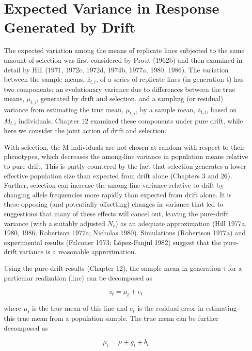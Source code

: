 \documentclass{article}
\begin{document}
\section{Expected Variance in Response Generated by Drift}
The expected variation among the means of replicate lines subjected to the same amount of selection was first considered by Prout (1962b) and then examined in detail by Hill (1971, 1972c, 1972d, 1974b, 1977a, 1980, 1986). The variation between the sample means,  $ \overline{z}_{t,i} $, of a series of replicate lines (in generation t) has two components: an evolutionary variance due to differences between the true means,  $ \mu_{t,i} $, generated by drift and selection, and a sampling (or residual) variance from estimating the true mean,  $ \mu_{t,i} $, by a sample mean,  $ \overline{z}_{t,i} $, based on  $ M_{t,i} $ individuals. Chapter 12 examined these components under pure drift, while here we consider the joint action of drift and selection.

With selection, the M individuals are not chosen at random with respect to their phenotypes, which decreases the among-line variance in population means relative to pure drift. This is partly countered by the fact that selection generates a lower effective population size than expected from drift alone (Chapters 3 and 26). Further, selection can increase the among-line variance relative to drift by changing allele frequencies more rapidly than expected from drift alone. It is these opposing (and potentially offsetting) changes in variance that led to suggestions that many of these effects will cancel out, leaving the pure-drift variance (with a suitably adjusted  $ N_{e} $) as an adequate approximation (Hill 1977a, 1980, 1986; Robertson 1977a; Nicholas 1980). Simulations (Robertson 1977a) and experimental results (Falconer 1973; López-Fanjul 1982) suggest that the pure-drift variance is a reasonable approximation.

Using the pure-drift results (Chapter 12), the sample mean in generation t for a particular realization (line) can be decomposed as

\begin{equation}
\overline{z}_{t}=\mu_{t}+e_{t}
\tag{18.1a}
\label{eq:18_1a}
\end{equation}

where  $ \mu_{t} $ is the true mean of this line and  $ e_{t} $ is the residual error in estimating this true mean from a population sample. The true mean can be further decomposed as

\begin{equation}
\mu_{t}=\mu+g_{t}+b_{t}
\tag{18.1b}
\label{eq:18_1b}
\end{equation}
\end{document}

